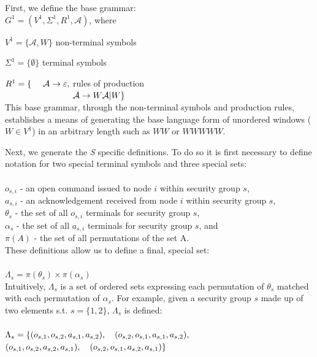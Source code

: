 \documentclass[oneside,12pt]{memoir}
\newcommand{\tab}{\hspace*{2em}}
\begin{document}
First, we define the base grammar:\\

\tab $G^1 = (V^1, \Sigma^1, R^1, \mathcal{A})$, where

\tab $V^1 = \{\mathcal{A} , W\}$ \hfill non-terminal symbols \hspace*{6em}

\tab $\Sigma ^1 = \{ \emptyset\}$ \hfill terminal symbols\hspace*{6.3em}

\tab $R^1 = \lbrace \hspace*{1.35em}\mathcal{A} \rightarrow \varepsilon ,$ \hfill rules of production \hspace*{6em} \\
$\tab \hspace*{5.9em} \mathcal{A}\rightarrow W\mathcal{A} |W\rbrace$\\

This base grammar, through the non-terminal symbols and production rules, establishes a means of generating the base language form of unordered windows ($W\in V^1$) in an arbitrary length such as $WW$ or $WWWWW$.

Next, we generate the \emph{S} specific definitions. To do so it is first necessary to define notation for two special terminal symbols and three special sets:\\
\\
$o_{s,i}$ - an open command issued to node $i$ within security group $s$,\\
$a_{s,i}$ - an acknowledgement received from node $i$ within security group $s$,\\
$\theta_s$ - the set of all $o_{s,i}$ terminals for security group $s$, \\
$\alpha_s$ - the set of all $a_{s,i}$ terminals for security group $s$, and \\
$\pi(A)$ - the set of all permutations of the set A.\\

These definitions allow us to define a final, special set:\\
\\
$\Lambda_s = \pi(\theta_s) \times \pi(\alpha_s)$\\

Intuitively, $\Lambda_s$ is a set of ordered sets expressing each permutation of $\theta_s$ matched with each permutation of $\alpha_s$. For example, given a security group $s$ made up of two elements s.t. $s = \{1, 2\}$, $\Lambda_s$ is defined:\\
\\
$\Lambda_s = \{ (o_{s,1}, o_{s,2}, a_{s,1}, a_{s,2}),\hspace*{1.0em} (o_{s,2}, o_{s,1}, a_{s,1}, a_{s,2}),$\\
\hspace*{3.0em}$ (o_{s,1}, o_{s,2}, a_{s,2}, a_{s,1}),\hspace*{1.0em} (o_{s,2}, o_{s,1}, a_{s,2}, a_{s,1})\}$\\
\end{document}
